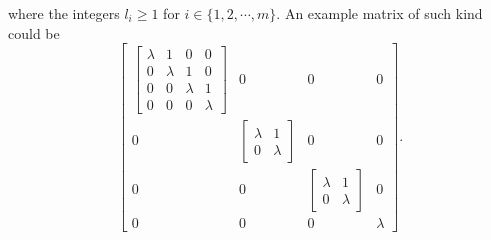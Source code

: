 where the integers $l_i \geq 1$ for $i \in \{1,2, \cdots, m\}$.
An example matrix of such kind could be
$$
\begin{bmatrix}
    \begin{bmatrix}
        \lambda & 1  & 0 &0 \\
        0 &\lambda  &1 &0\\
        0 &0 &\lambda &1 \\
        0 &0 &0 &\lambda
    \end{bmatrix}
    &0 &0 &0 \\
    0  &\begin{bmatrix}
        \lambda & 1\\
        0 &\lambda
        \end{bmatrix}
    &0 &0 \\
    0  &0 &\begin{bmatrix}
        \lambda & 1\\
        0 &\lambda
        \end{bmatrix}
    &0 \\
    0 &0 &0 &\lambda
\end{bmatrix}.
$$


